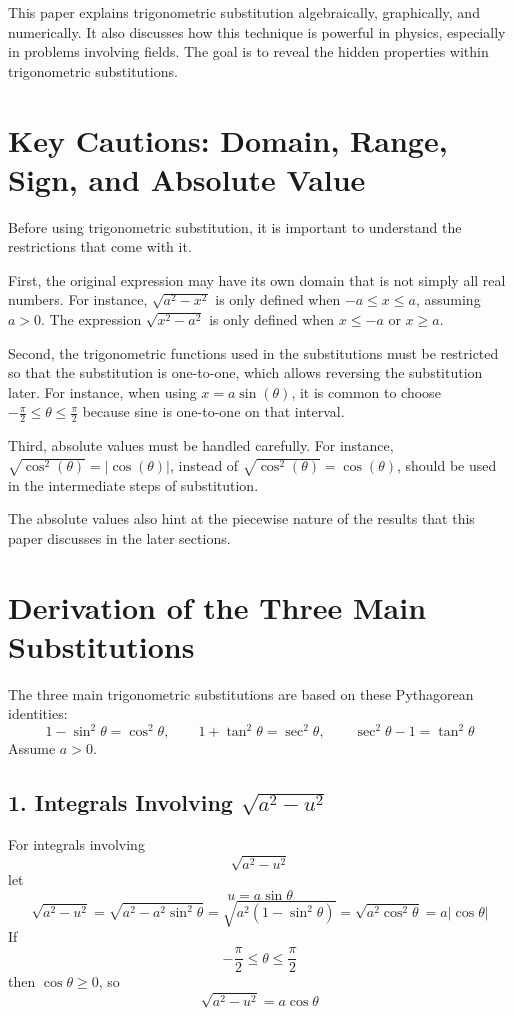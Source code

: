 \documentclass[12pt]{article}
\begin{document}
This paper explains trigonometric substitution algebraically, graphically, and numerically. It also discusses how this technique is powerful in physics, especially in problems involving fields. The goal is to reveal the hidden properties within trigonometric substitutions.

\section{Key Cautions: Domain, Range, Sign, and Absolute Value}

Before using trigonometric substitution, it is important to understand the restrictions that come with it.

First, the original expression may have its own domain that is not simply all real numbers. For instance, \(\sqrt{a^2 - x^2}\) is only defined when \(-a \le x \le a\), assuming \(a > 0\). The expression \(\sqrt{x^2 - a^2}\) is only defined when \(x \le -a\) or \(x \ge a\).

Second, the trigonometric functions used in the substitutions must be restricted so that the substitution is one-to-one, which allows reversing the substitution later. For instance, when using \(x = a\sin(\theta)\), it is common to choose \(-\frac{\pi}{2} \le \theta \le \frac{\pi}{2}\) because sine is one-to-one on that interval.

Third, absolute values must be handled carefully. For instance, \(\sqrt{\cos^2(\theta)} = |\cos(\theta)|\), instead of \(\sqrt{\cos^2(\theta)} = \cos(\theta)\), should be used in the intermediate steps of substitution.

The absolute values also hint at the piecewise nature of the results that this paper discusses in the later sections.

\section{Derivation of the Three Main Substitutions}

The three main trigonometric substitutions are based on these Pythagorean identities:
\[
1-\sin^2\theta=\cos^2\theta,\qquad
1+\tan^2\theta=\sec^2\theta,\qquad
\sec^2\theta-1=\tan^2\theta
\]
Assume \(a>0\).

\subsection*{1. Integrals Involving \(\sqrt{a^2-u^2}\)}

For integrals involving
\[
\sqrt{a^2-u^2}
\]
let
\[
u=a\sin\theta
\]
\[
\sqrt{a^2-u^2}
=\sqrt{a^2-a^2\sin^2\theta}
=\sqrt{a^2(1-\sin^2\theta)}
=\sqrt{a^2\cos^2\theta}
=a|\cos\theta|
\]
If
\[
-\frac{\pi}{2}\le \theta\le \frac{\pi}{2}
\]
then \(\cos\theta\ge 0\), so
\[
\sqrt{a^2-u^2}=a\cos\theta
\]
\end{document}
